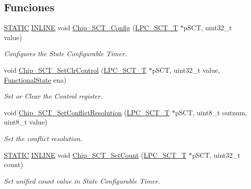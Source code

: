 \subsection*{Funciones}
\begin{DoxyCompactItemize}
\item 
\hyperlink{group___l_p_c___types___public___macros_ga10b2d890d871e1489bb02b7e70d9bdfb}{S\+T\+A\+T\+IC} \hyperlink{spifi__18xx__43xx_8h_a2eb6f9e0395b47b8d5e3eeae4fe0c116}{I\+N\+L\+I\+NE} void \hyperlink{group___s_c_t__18_x_x__43_x_x_ga1c4a7a1622ec276ae01e01e8fe3ad2e6}{Chip\+\_\+\+S\+C\+T\+\_\+\+Config} (\hyperlink{struct_l_p_c___s_c_t___t}{L\+P\+C\+\_\+\+S\+C\+T\+\_\+T} $\ast$p\+S\+CT, uint32\+\_\+t value)
\begin{DoxyCompactList}\small\item\em Configures the State Configurable Timer. \end{DoxyCompactList}\item 
void \hyperlink{group___s_c_t__18_x_x__43_x_x_ga116504a56b8154a596b701496fd08ef3}{Chip\+\_\+\+S\+C\+T\+\_\+\+Set\+Clr\+Control} (\hyperlink{struct_l_p_c___s_c_t___t}{L\+P\+C\+\_\+\+S\+C\+T\+\_\+T} $\ast$p\+S\+CT, uint32\+\_\+t value, \hyperlink{group___l_p_c___types___public___types_gac9a7e9a35d2513ec15c3b537aaa4fba1}{Functional\+State} ena)
\begin{DoxyCompactList}\small\item\em Set or Clear the Control register. \end{DoxyCompactList}\item 
void \hyperlink{group___s_c_t__18_x_x__43_x_x_ga7b35d2d5a1f5c007abdcd96fb6e8dfe6}{Chip\+\_\+\+S\+C\+T\+\_\+\+Set\+Conflict\+Resolution} (\hyperlink{struct_l_p_c___s_c_t___t}{L\+P\+C\+\_\+\+S\+C\+T\+\_\+T} $\ast$p\+S\+CT, uint8\+\_\+t outnum, uint8\+\_\+t value)
\begin{DoxyCompactList}\small\item\em Set the conflict resolution. \end{DoxyCompactList}\item 
\hyperlink{group___l_p_c___types___public___macros_ga10b2d890d871e1489bb02b7e70d9bdfb}{S\+T\+A\+T\+IC} \hyperlink{spifi__18xx__43xx_8h_a2eb6f9e0395b47b8d5e3eeae4fe0c116}{I\+N\+L\+I\+NE} void \hyperlink{group___s_c_t__18_x_x__43_x_x_ga8990a3d34b196d1ed7b25f7a6068b764}{Chip\+\_\+\+S\+C\+T\+\_\+\+Set\+Count} (\hyperlink{struct_l_p_c___s_c_t___t}{L\+P\+C\+\_\+\+S\+C\+T\+\_\+T} $\ast$p\+S\+CT, uint32\+\_\+t count)
\begin{DoxyCompactList}\small\item\em Set unified count value in State Configurable Timer. \end{DoxyCompactList}\item 

\end{DoxyCompactItemize}
